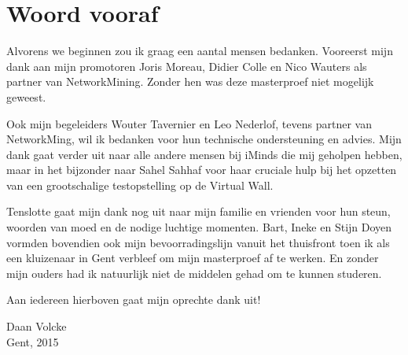 \chapter*{Woord vooraf}

Alvorens we beginnen zou ik graag een aantal mensen bedanken.
Vooreerst mijn dank aan mijn promotoren Joris Moreau, Didier Colle en Nico Wauters als partner van NetworkMining.
Zonder hen was deze masterproef niet mogelijk geweest.

Ook mijn begeleiders Wouter Tavernier en Leo Nederlof, tevens partner van NetworkMing, wil ik bedanken voor hun technische ondersteuning en advies.
Mijn dank gaat verder uit naar alle andere mensen bij iMinds die mij geholpen hebben,
maar in het bijzonder naar Sahel Sahhaf voor haar cruciale hulp bij het opzetten van een grootschalige testopstelling op de Virtual Wall.

Tenslotte gaat mijn dank nog uit naar mijn familie en vrienden voor hun steun, woorden van moed en de nodige luchtige momenten.
Bart, Ineke en Stijn Doyen vormden bovendien ook mijn bevoorradingslijn vanuit het thuisfront toen ik als een kluizenaar in Gent verbleef om mijn masterproef af te werken.
En zonder mijn ouders had ik natuurlijk niet de middelen gehad om te kunnen studeren.


Aan iedereen hierboven gaat mijn oprechte dank uit!


\begin{flushright}
Daan Volcke \\
Gent, 2015
\end{flushright}

